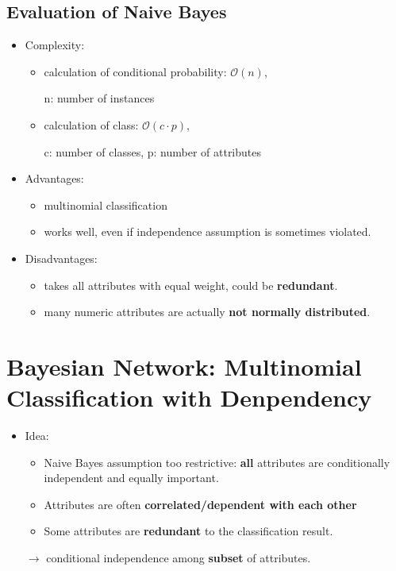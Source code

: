 \subsection{Evaluation of Naive Bayes}
\begin{itemize}
	\item Complexity: 
	\begin{itemize}
		\item calculation of conditional probability: $\mathcal{O}(n)$, 
		
		n: number of instances
		\item calculation of class: $\mathcal{O}(c\cdot p)$, 
		
		c: number of classes, p: number of attributes
	\end{itemize}
	
	\item Advantages: 
	\begin{itemize}
		\item multinomial classification
		\item works well, even if independence assumption is sometimes violated.
	\end{itemize}
	\item Disadvantages:
	\begin{itemize}
		\item takes all attributes with equal weight, could be \textbf{redundant}.
		\item many numeric attributes are actually \textbf{not normally distributed}. 
	\end{itemize}
\end{itemize}

\section{Bayesian Network: Multinomial Classification with Denpendency}

\begin{itemize}
	\item Idea: 
	\begin{itemize}
		\item Naive Bayes assumption too restrictive: \textbf{all} attributes are conditionally independent and equally important.
		\item Attributes are often \textbf{correlated/dependent with each other}
		\item Some attributes are \textbf{redundant} to the classification result.
	\end{itemize}	
	$\rightarrow$ conditional independence among \textbf{subset} of attributes.
\end{itemize}

